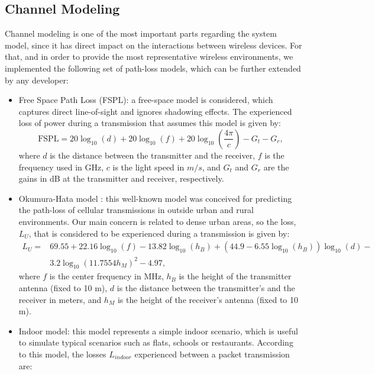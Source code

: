 \documentclass[a4paper]{article}
\begin{document}
	\subsection{Channel Modeling}
	Channel modeling is one of the most important parts regarding the system model, since it has direct impact on the interactions between wireless devices. For that, and in order to provide the most representative wireless environments, we implemented the following set of path-loss models, which can be further extended by any developer:
	\begin{itemize}
		\item Free Space Path Loss (FSPL): a free-space model is considered, which captures direct line-of-sight and ignores shadowing effects. The experienced loss of power during a transmission that assumes this model is given by:
		\begin{equation}
			\text{FSPL} = 20 \log_{10}(d) + 20 \log_{10}(f) + 20 \log_{10}(\frac{4\pi}{c}) - G_t - G_r,
			\nonumber
		\end{equation}
		where $d$ is the distance between the transmitter and the receiver, $f$ is the frequency used in GHz, $c$ is the light speed in $m/s$, and $G_t$ and $G_r$ are the gains in dB at the transmitter and receiver, respectively.
		\item Okumura-Hata model \cite{hata1980empirical}: this well-known model was conceived for predicting the path-loss of cellular transmissions in outside urban and rural environments. Our main concern is related to dense urban areas, so the loss, $L_U$, that is considered to be experienced during a transmission is given by: 
		\begin{equation}
		\begin{aligned}
			L_U =  &69.55 + 22.16 \log_{10}(f) - 13.82 \log_{10} (h_B) + (44.9 - 6.55 \log_{10}(h_B)) \log_{10}(d) - \\ 
			& 3.2 \log_{10}(11.7554 h_M)^2 - 4.97,
		\end{aligned}
		\nonumber
		\end{equation}
		where $f$ is the center frequency in MHz, $h_B$ is the height of the transmitter antenna (fixed to 10 m), $d$ is the distance between the transmitter's and the receiver in meters, and $h_M$ is the height of the receiver's antenna (fixed to 10 m).
		\item Indoor model: this model represents a simple indoor scenario, which is useful to simulate typical scenarios such as flats, schools or restaurants. According to this model, the losses $L_{indoor}$ experienced between a packet transmission are:		

\end{itemize}
\end{document}
